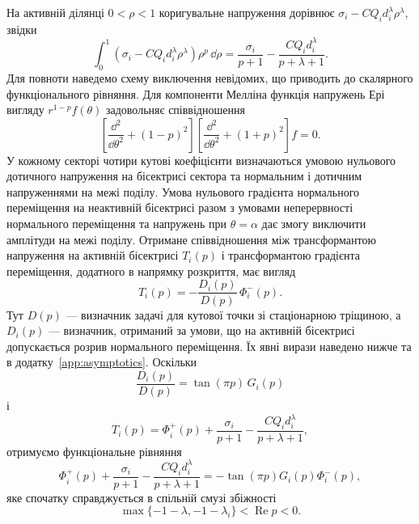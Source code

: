 На активній ділянці $0<\rho<1$ коригувальне напруження дорівнює $\sigma_i-CQ_i d_i^\lambda\rho^\lambda$, звідки
\begin{equation*}
  \int_0^1
  \left(\sigma_i-CQ_i d_i^\lambda\rho^\lambda\right)
  \rho^p\,\dd\rho
  =
  \frac{\sigma_i}{p+1}
  -\frac{CQ_i d_i^\lambda}{p+\lambda+1}.
\end{equation*}
Для повноти наведемо схему виключення невідомих, що приводить до скалярного функціонального рівняння. Для компоненти Мелліна функція напружень Ері вигляду $r^{1-p}f(\theta)$ задовольняє співвідношення
\begin{equation*}
  \left[\frac{\dd^2}{\dd\theta^2}+(1-p)^2\right]
  \left[\frac{\dd^2}{\dd\theta^2}+(1+p)^2\right]f=0.
\end{equation*}
У кожному секторі чотири кутові коефіцієнти визначаються умовою нульового дотичного напруження на бісектрисі сектора та нормальним і дотичним напруженнями на межі поділу. Умова нульового градієнта нормального переміщення на неактивній бісектрисі разом з умовами неперервності нормального переміщення та напружень при $\theta=\alpha$ дає змогу виключити амплітуди на межі поділу. Отримане співвідношення між трансформантою напруження на активній бісектрисі $T_i(p)$ і трансформантою градієнта переміщення, додатного в напрямку розкриття, має вигляд
\begin{equation*}
  T_i(p)=-\frac{D_i(p)}{D(p)}\,\Phi_i^-(p).
\end{equation*}
Тут $D(p)$ — визначник задачі для кутової точки зі стаціонарною тріщиною, а $D_i(p)$ — визначник, отриманий за умови, що на активній бісектрисі допускається розрив нормального переміщення. Їх явні вирази наведено нижче та в додатку~\ref{app:asymptotics}. Оскільки
\begin{equation*}
  \frac{D_i(p)}{D(p)}=\tan(\pi p)\,G_i(p)
\end{equation*}
і
\begin{equation*}
  T_i(p)=
  \Phi_i^+(p)+\frac{\sigma_i}{p+1}
  -\frac{CQ_i d_i^\lambda}{p+\lambda+1},
\end{equation*}
отримуємо функціональне рівняння
\begin{equation}
\label{eq:wiener-hopf-functional}
  \Phi_i^+(p)
  +\frac{\sigma_i}{p+1}
  -\frac{CQ_i d_i^\lambda}{p+\lambda+1}
  =-\tan(\pi p)G_i(p)\Phi_i^-(p),
\end{equation}
яке спочатку справджується в спільній смузі збіжності
\begin{equation*}
  \max\{-1-\lambda,-1-\lambda_i\}
  <\operatorname{Re}p<0.
\end{equation*}
